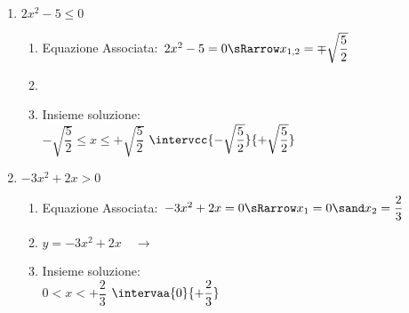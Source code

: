 \begin{esempio}
\begin{enumerate}
\newpage %
\item \(2x^2-5 \leqslant 0\)

\begin{enumerate}
 \item
  Equazione Associata:~\(2x^2-5=0 \sRarrow 
                        x_{1, 2}= \mp \sqrt{\dfrac{5}{2}}\)
 \item 
  {}
 \item
Insieme soluzione: \\
\insiemesoluzione
  {}
  {\(-\sqrt{\dfrac{5}{2}} \leqslant x \leqslant +\sqrt{\dfrac{5}{2}}\)}
  {\(\intervcc{-\sqrt{\dfrac{5}{2}}}{+\sqrt{\dfrac{5}{2}}}\)}
\end{enumerate}

\item \(-3x^2 + 2x > 0\)

\begin{enumerate}
 \item
  Equazione Associata:~\(-3x^2 + 2x=0 \sRarrow 
                        x_{1}= 0 \sand x_{2}= \dfrac{2}{3}\)
 \item 
 \funzioneassociata
   {\(y = -3x^2 + 2x \quad \rightarrow\)}
   {}
 \item 
Insieme soluzione: \\
 \insiemesoluzione
   {}
   {\(0 < x < +\dfrac{2}{3}\)}
   {\(\intervaa{0}{+\dfrac{2}{3}}\)}
\end{enumerate}

\end{enumerate}
\end{esempio}

